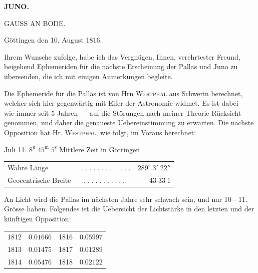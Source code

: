 \clearpage
\thispagestyle{empty}
\noindent{}%
%
\parbox[t]{\dimexpr\linewidth-24mm\relax}{\centering\footnotesize\bfseries JUNO.\par}%
\makebox[12mm][r]{}\par\nobreak\medskip
\begin{center}
\large GAUSS AN BODE.
\end{center}
\begin{flushright}Göttingen den 10. August 1816.\end{flushright}

\par\indent Ihrem Wunsche zufolge, habe ich das Vergnügen, Ihnen, verehrtester Freund, beigehend Ephemeriden für die nächste Erscheinung der Pallas und Juno zu übersenden, die ich mit einigen Anmerkungen begleite.

\par\indent Die Ephemeride für die Pallas ist von Hrn \textsc{Westphal} aus Schwerin berechnet, welcher sich hier gegenwärtig mit Eifer der Astronomie widmet. Es ist dabei — wie immer seit 5 Jahren — auf die Störungen nach meiner Theorie Rücksicht genommen, und daher die genaueste Uebereinstimmung zu erwarten. Die nächste Opposition hat Hr. \textsc{Westphal}, wie folgt, im Voraus berechnet:
\begin{center}\fontsize{10}{12} Juli 11. $8^{\mathrm u}\;45^{\mathrm m}\;5^{\mathrm s}$ Mittlere Zeit in Göttingen\par
\setlength{\tabcolsep}{3pt}\begin{tabular}{lcr}
Wahre Länge & $.\;.\;.\;.\;.\;.\;.\;.\;.\;.\;.\;.\;.\;.$ & $289^\circ\;3'\;22''$\\
Geocentrische Breite & $.\;.\;.\;.\;.\;.\;.\;.\;.\;.\;.$ & $43\;33\;1$\\
\end{tabular}\end{center}

\par\indent An Licht wird die Pallas im nächsten Jahre sehr schwach sein, und nur 10—11. Grösse haben. Folgendes ist die Uebersicht der Lichtstärke in den letzten und der künftigen Opposition:
\begin{center}\fontsize{10}{12}\selectfont\setlength{\tabcolsep}{11pt}\begin{tabular}{lr|lr}
1812 & $0.01666$ & 1816 & $0.05997$\\
1813 & $0.01475$ & 1817 & $0.01289$\\
1814 & $0.05476$ & 1818 & $0.02122$\\
\end{tabular}\end{center}

